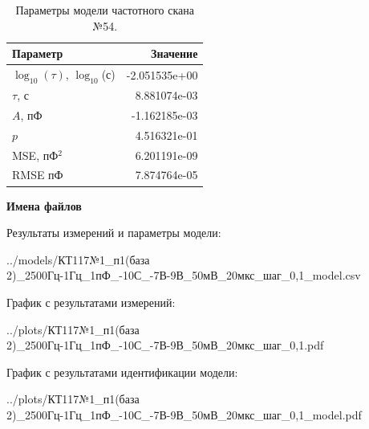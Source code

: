 \begin{table}[!ht]
    \centering
    \caption{Параметры модели частотного скана №54.}
    \begin{tabular}{|l|r|}
        \hline
        Параметр                                       & Значение                  \\ \hline
        $\log_{10}(\tau)$, $\log_{10}$(с)              & -2.051535e+00             \\ \hline
        $\tau$, с                                      & 8.881074e-03              \\ \hline
        $A$, пФ                                        & -1.162185e-03             \\ \hline
        $p$                                            & 4.516321e-01              \\ \hline
        MSE, пФ$^2$                                    & 6.201191e-09              \\ \hline
        RMSE пФ                                        & 7.874764e-05              \\ \hline
    \end{tabular}
    \label{table:frequency_scan_model_54}
\end{table}

\textbf{Имена файлов}

Результаты измерений и параметры модели:

\scriptsize../models/КТ117№1\_п1(база 2)\_2500Гц-1Гц\_1пФ\_-10С\_-7В-9В\_50мВ\_20мкс\_шаг\_0,1\_model.csv
\normalsize

График с результатами измерений:

\scriptsize../plots/КТ117№1\_п1(база 2)\_2500Гц-1Гц\_1пФ\_-10С\_-7В-9В\_50мВ\_20мкс\_шаг\_0,1.pdf
\normalsize

График с результатами идентификации модели:

\scriptsize../plots/КТ117№1\_п1(база 2)\_2500Гц-1Гц\_1пФ\_-10С\_-7В-9В\_50мВ\_20мкс\_шаг\_0,1\_model.pdf
\normalsize

